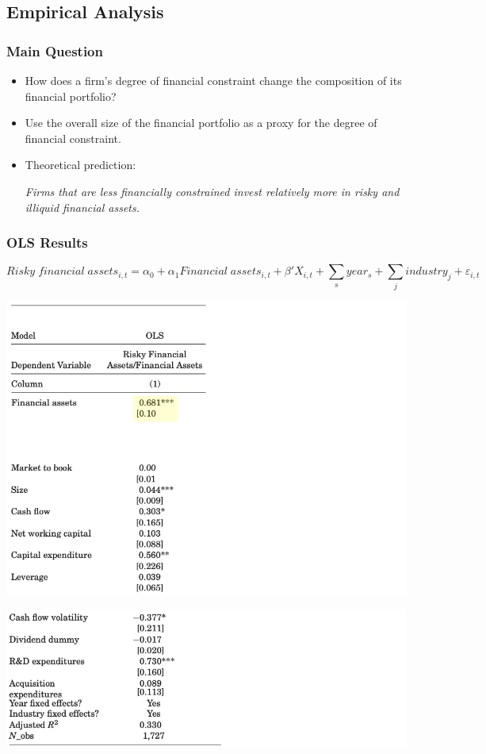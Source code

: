 \documentclass[handout]{beamer}
\begin{document}
\subsection{Empirical Analysis}




\begin{frame}
\frametitle{Main Question}
\begin{itemize}[<+->]
\item How does a firm's degree of financial constraint change the composition of its financial portfolio?
\item Use the overall size of the financial portfolio as a proxy for the degree of financial constraint.
\item Theoretical prediction:

\bigskip

\textit{Firms that are less financially constrained invest relatively more in risky and illiquid financial assets.}
\end{itemize}
\end{frame}


\begin{frame}
\frametitle{OLS Results}

\footnotesize

$$
Risky \; financial \; assets_{i,t} = \alpha_0 + \alpha_1 Financial \; assets_{i,t} + \beta' X_{i,t} + \sum_s year_s + \sum_j industry_j + \varepsilon_{i,t}
$$

\centering
\includegraphics[scale=0.21]{regression_1_ols}

\includegraphics[scale=0.21]{regression_2_ols}

\end{frame}
\end{document}
